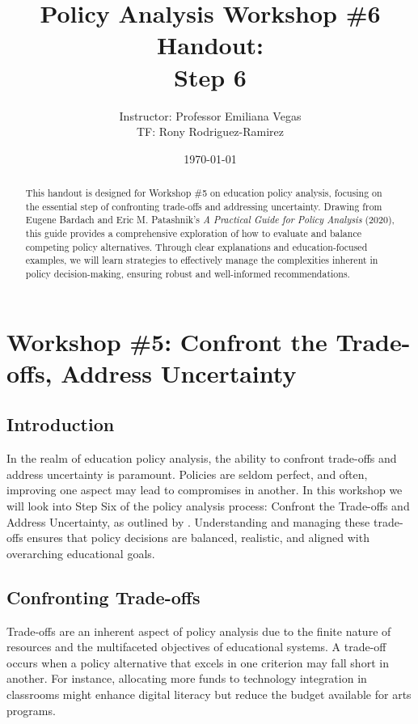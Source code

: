 \documentclass{article}
\title{Policy Analysis Workshop \#6 Handout:\\Step 6}
\author{Instructor: Professor Emiliana Vegas \\ TF: Rony Rodriguez-Ramirez}
\date{\today}
\theoremstyle{definition}
\theoremstyle{plain}
\begin{document}
\maketitle

\begin{abstract}
This handout is designed for Workshop \#5 on education policy analysis, focusing on the essential step of confronting trade-offs and addressing uncertainty. Drawing from Eugene Bardach and Eric M. Patashnik's \textit{A Practical Guide for Policy Analysis} (2020), this guide provides a comprehensive exploration of how to evaluate and balance competing policy alternatives. Through clear explanations and education-focused examples, we will learn strategies to effectively manage the complexities inherent in policy decision-making, ensuring robust and well-informed recommendations.
\end{abstract}

\section{Workshop \#5: Confront the Trade-offs, Address Uncertainty}

\subsection{Introduction}

In the realm of education policy analysis, the ability to confront trade-offs and address uncertainty is paramount. Policies are seldom perfect, and often, improving one aspect may lead to compromises in another. In this workshop we will look into Step Six of the policy analysis process: Confront the Trade-offs and Address Uncertainty, as outlined by \citet{Bardach2020}. Understanding and managing these trade-offs ensures that policy decisions are balanced, realistic, and aligned with overarching educational goals.

\subsection{Confronting Trade-offs}

Trade-offs are an inherent aspect of policy analysis due to the finite nature of resources and the multifaceted objectives of educational systems. A trade-off occurs when a policy alternative that excels in one criterion may fall short in another. For instance, allocating more funds to technology integration in classrooms might enhance digital literacy but reduce the budget available for arts programs.
\end{document}
